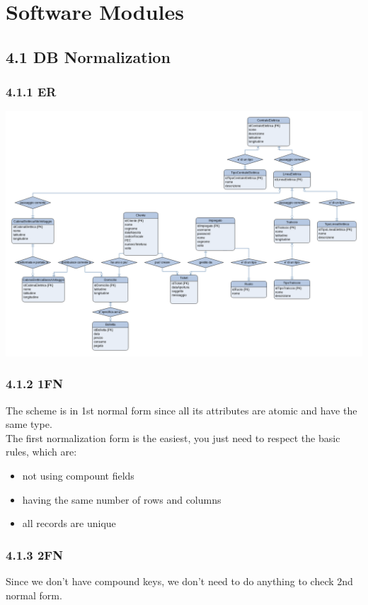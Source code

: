 \chapter{Software Modules} %

\section*{4.1 \hspace{1cm} DB Normalization}
\subsection*{4.1.1 \hspace{1cm} ER}
\includegraphics[width=\linewidth]{Figures/ER.png}
\subsection * {4.1.2 \hspace {1cm} 1FN}
The scheme is in 1st normal form since all its attributes are atomic and have the same type. \\
The first normalization form is the easiest, you just need to respect the basic rules, which are:
\begin {itemize}
    \item not using compount fields
    \item having the same number of rows and columns
    \item all records are unique
\end {itemize}

\subsection * {4.1.3 \hspace {1cm} 2FN}
Since we don't have compound keys, we don't need to do anything to check 2nd normal form. \\


